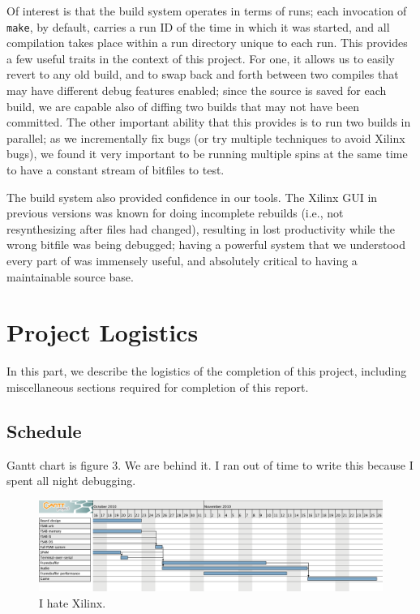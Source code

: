 \documentclass[10pt]{report}
\begin{document}
Of interest is that the build system operates in terms of runs; each
invocation of \texttt{make}, by default, carries a run ID of the time in which it was
started, and all compilation takes place within a run directory unique to
each run. This provides a few useful traits in the context of this project.
For one, it allows us to easily revert to any old build, and to swap back
and forth between two compiles that may have different debug features
enabled; since the source is saved for each build, we are capable also of
diffing two builds that may not have been committed. The other important
ability that this provides is to run two builds in parallel; as we
incrementally fix bugs (or try multiple techniques to avoid Xilinx bugs), we
found it very important to be running multiple spins at the same time to
have a constant stream of bitfiles to test.

The build system also provided confidence in our tools. The Xilinx GUI in
previous versions was known for doing incomplete rebuilds (i.e., not
resynthesizing after files had changed), resulting in lost productivity
while the wrong bitfile was being debugged; having a powerful system that we
understood every part of was immensely useful, and absolutely critical to
having a maintainable source base.


\chapter{Project Logistics}

In this part, we describe the logistics of the completion of this project,
including miscellaneous sections required for completion of this report.

\section{Schedule}

Gantt chart is figure 3.  We are behind it.  I ran out of time to write
this because I spent all night debugging.

\begin{figure}
  \centering
    \includegraphics[width=\textwidth]{gantt-chart.png}
  \caption{I hate Xilinx.} \label{fig:gantt}
\end{figure}
\end{document}
